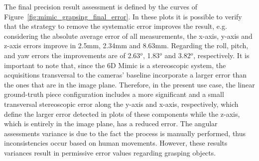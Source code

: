 The final precision result assessment is defined by the curves of Figure~\ref{fig:mimic_grapsing_final_error}. In these plots it is possible to verify that the strategy to remove the systematic error improves the result, e.g. considering the absolute average error of all measurements, the x-axis, y-axis and z-axis errors improve in 2.5mm, 2.34mm and 8.63mm. Regarding the roll, pitch, and yaw errors the improvements are of 2.63$^o$, 1.83$^o$ and 3.82$^o$, respectively. It is important to note that, since the 6D Mimic is a stereoscopic system, the acquisitions transversal to the cameras' baseline incorporate a larger error than the ones that are in the image plane. Therefore, in the present use case,  the linear ground-truth piece configuration includes a more significant and a small transversal stereoscopic error along the y-axis and x-axis, respectively, which define the larger error detected in plots of these components while the z-axis, which is entirely in the image plane, has a reduced error. The angular assessments variance is due to the fact the process is manually performed, thus inconsistencies occur based on human movements. However, these results variances result in permissive error values regarding grasping objects.


